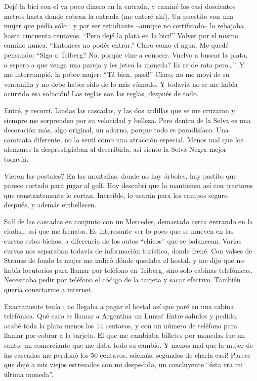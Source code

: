 Dej\'e la bici con el ya poco dinero en la entrada, y camin\'e los
casi doscientos metros hasta donde cobran la entrada (me enter\'e ah\'i). Un
puestito con una mujer que ped\'ia s\'olo ; y por ser
estudiante --aunque no certificado-- lo rebajaba hasta cincuenta centavos.
``\textexclamdown Pero dej\'e la plata en la bici!'' Volver por el mismo camino
nunca. ``Entonces no pod\'es entrar.'' Claro como el agua. Me qued\'e pensando:
``\textquestiondown Sigo a Triberg? No, porque vine a conocer. \textquestiondown
Vuelvo a buscar la plata, o espero a que venga una pareja y les jeteo la moneda?
Es re de rata pero\ldots''. Y me interrumpi\'o, la pobre mujer: ``T\'a bien,
\textexclamdown pas\'a!'' Claro, no me mov\'i de su ventanilla y no debe haber
sido de lo m\'as c\'omodo. \textexclamdown Y todav\'ia no se me hab\'ia ocurrido
esa soluci\'on! Las reglas son las reglas, despu\'es de todo.

Entr\'e, y recorr\'i. Lindas las cascadas, y las dos ardillas que se me cruzaron
y siempre me sorprenden por su velocidad y belleza. Pero dentro de la Selva es
una decoraci\'on m\'as, algo original, un adorno, porque todo es paradis\'iaco.
Una caminata diferente, no la sent\'i como una atracci\'on especial. Menos mal
que los alemanes la desprestigiaban al describirla, as\'i siento la Selva Negra
mejor todav\'ia.

\textquestiondown Vieron las postales? En las monta\~nas, donde no hay
\'arboles, hay pastito que parece cortado para jugar al golf. Hoy descubr\'i
que lo mantienen as\'i con tractores que constantemente lo cortan.
Incre\'ible, lo usar\'an para los campos seguro despu\'es, y adem\'as
embellecen.

Sal\'i de las cascadas en conjunto con un Mercedes, demasiado cerca entrando
en la ciudad, as\'i que me frenaba. Es interesante ver lo poco que se mueven
en las curvas estos bichos, a diferencia de los autos ``chicos'' que se
balancean. Varias curvas nos separaban todav\'ia de informaci\'on tur\'istica,
donde fren\'e. Con valses de Strauss de fondo la mujer me indic\'o d\'onde
quedaba el hostal, y me dijo que no hab\'ia locutorios para llamar por
tel\'efono en Triberg, sino solo cabinas telef\'onicas. Necesitaba pedir por
tel\'efono el c\'odigo de la tarjeta y sacar efectivo. Tambi\'en quer\'ia
conectarme a internet.

Exactamente ten\'ia ; no llegaba a pagar el hostal
as\'i que par\'e en una cabina telef\'onica. \textexclamdown Qu\'e caro es
llamar a Argentina un Lunes! Entre saludos y pedido, acab\'e toda la plata
menos los 14 centavos, y con un n\'umero de tel\'efono para llamar por cobrar
a la tarjeta. El que me cambiaba billetes por monedas fue un santo, un
comerciante que me daba todo su cambio. Y menos mal que la mujer de las
cascadas me perdon\'o los 50 centavos, adem\'as,  segundos
de charla casi! Parece que dej\'e a mis viejos estresados con mi despedida, un
concluyente ``\'esta era mi \'ultima moneda''.

